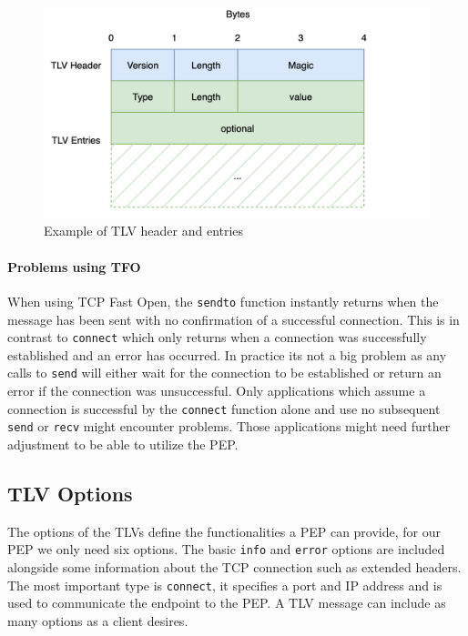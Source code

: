 \documentclass[a4paper,english, 11pt]{report}
\begin{document}
\begin{figure} %
	\centering
	\includegraphics[scale=0.35]{../diagrams/drawio/tlv.png}
  	\caption{Example of TLV header and entries}
  	\label{fig:tlv_example}
\end{figure}

\paragraph{Problems using TFO}
When using TCP Fast Open, the \verb|sendto| function instantly returns when the message has been sent with no confirmation of a successful connection. This is in contrast to \verb|connect| which only returns when a connection was successfully established and an error has occurred. In practice its not a big problem as any calls to \verb|send| will either wait for the connection to be established or return an error if the connection was unsuccessful. Only applications which assume a connection is successful by the \verb|connect| function alone and use no subsequent \verb|send| or \verb|recv| might encounter problems. Those applications might need further adjustment to be able to utilize the PEP.

\subsection{TLV Options}
The options of the TLVs define the functionalities a PEP can provide, for our PEP we only need six options. The basic \verb|info| and \verb|error| options are included alongside some information about the TCP connection such as extended headers. The most important type is \verb|connect|, it specifies a port and IP address and is used to communicate the endpoint to the PEP. A TLV message can include as many options as a client desires.
\end{document}

